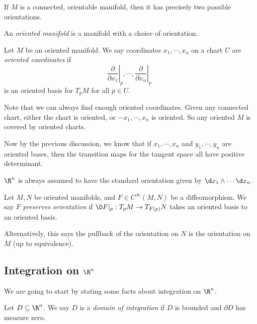 \documentclass[a4paper]{article}
\begin{document}
If $M$ is a connected, orientable manifold, then it has precisely two possible orientations.

\begin{defi}
  An \emph{oriented manifold} is a manifold with a choice of orientation.
\end{defi}

\begin{defi}
  Let $M$ be an oriented manifold. We say coordinates $x_1, \cdots, x_n$ on a chart $U$ are \emph{oriented coordinates} if
  \[
    \left.\frac{\partial}{\partial x_1}\right|_p, \cdots, \left.\frac{\partial}{\partial x_n}\right|_p
  \]
  is an oriented basis for $T_p M$ for all $p \in U$.
\end{defi}
Note that we can always find enough oriented coordinates. Given any connected chart, either the chart is oriented, or $-x_1, \cdots, x_n$ is oriented. So any oriented $M$ is covered by oriented charts.

Now by the previous discussion, we know that if $x_1, \cdots, x_n$ and $y_1, \cdots, y_n$ are oriented bases, then the transition maps for the tangent space all have positive determinant.

\begin{eg}
  $\R^n$ is always assumed to have the standard orientation given by $\d x_1 \wedge \cdots \d x_n$.
\end{eg}

\begin{defi}
  Let $M, N$ be oriented manifolds, and $F \in C^\infty(M, N)$ be a diffeomorphism. We say $F$ \emph{preserves orientation} if $\D F|_p: T_p M \to T_{F(p)}N$ takes an oriented basis to an oriented basis.

  Alternatively, this says the pullback of the orientation on $N$ is the orientation on $M$ (up to equivalence).
\end{defi}

\subsection{Integration on \texorpdfstring{$\R^n$}{Rn}}
We are going to start by stating some facts about integration on $\R^n$.

\begin{defi}
  Let $D \subseteq \R^n$. We say $D$ is a \emph{domain of integration} if $D$ is bounded and $\partial D$ has measure zero.
\end{defi}
\end{document}
